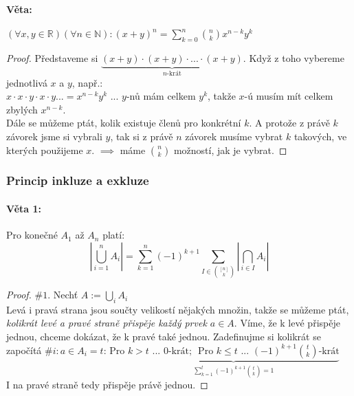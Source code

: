 \documentclass[10pt,a4paper]{article}
\begin{document}
\paragraph*{Věta: } $(\forall x,y \in \mathbb{R}) (\forall n \in \mathbb{N}): \displaystyle (x+y)^n = \sum_{k=0}^{n} \binom nk x^{n-k}y^k$
\begin{proof}
    Představeme si $\underbrace{(x+y)\cdot (x+y) \cdot ... \cdot (x+y)}_{n\text{-krát}}$. Když z toho vybereme jednotlivá $x$ a $y$, např.: \\$x \cdot x \cdot y \cdot x \cdot y ... = x^{n-k}y^k$ ... $y$-nů mám celkem $y^k$, takže $x$-ú musím mít celkem zbylých $x^{n-k}$.\\
    Dále se můžeme ptát, kolik existuje členů pro konkrétní $k$. A protože z právě $k$ závorek jsme si vybrali $y$, tak si z právě $n$ závorek musíme vybrat $k$ takových, ve kterých použijeme $x$. $\implies$ máme $\binom nk$ možností, jak je vybrat.
\end{proof}

\subsubsection{Princip inkluze a exkluze}
\paragraph*{Věta 1:} Pro konečné $A_1$ až $A_n$ platí:
\[
    \left | \bigcup_{i=1}^{n} A_i \right | = \sum_{k=1}^{n} (-1)^{k+1} \sum_{I\in \binom{[n]}{k}} \left | \bigcap_{i\in I} A_i \right |
\]
\begin{proof} $\#1$. Nechť $A := \displaystyle \bigcup_i A_i$\\
    Levá i pravá strana jsou součty velikostí nějakých množin, takže se můžeme ptát, \textit{kolikrát levé a pravé straně přispěje každý prvek $a\in A$}.
    Víme, že k levé přispěje jednou, chceme dokázat, že k pravé také jednou. Zadefinujme si kolikrát se započítá $\#i: a\in A_i = t$: Pro $\underbrace{k>t \text{ ... } 0\text{-krát; } \text{ Pro }k\leq t \text{ ... } (-1)^{k+1} \binom tk\text{-krát}}_{\displaystyle \sum_{k=1}^{t} (-1)^{k+1} \binom tk = 1}$\\
    I na pravé straně tedy přispěje právě jednou.
\end{proof}
\end{document}
